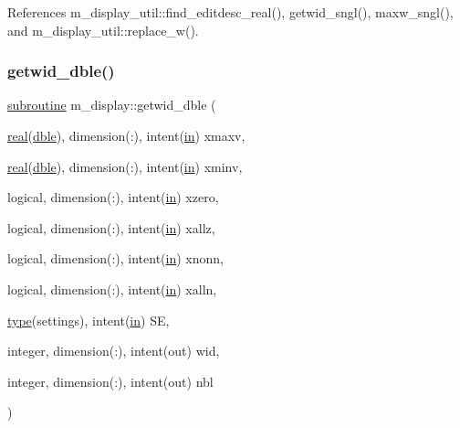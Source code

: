 References m\+\_\+display\+\_\+util\+::find\+\_\+editdesc\+\_\+real(), getwid\+\_\+sngl(), maxw\+\_\+sngl(), and m\+\_\+display\+\_\+util\+::replace\+\_\+w().

\mbox{\label{namespacem__display_abfcfe1ce55c2ec6aa7a261f6039a19d4}} 
\subsubsection{\texorpdfstring{getwid\+\_\+dble()}{getwid\_dble()}}
{\footnotesize\ttfamily \hyperlink{M__stopwatch_83_8txt_acfbcff50169d691ff02d4a123ed70482}{subroutine} m\+\_\+display\+::getwid\+\_\+dble (\begin{DoxyParamCaption}\item[{\hyperlink{read__watch_83_8txt_abdb62bde002f38ef75f810d3a905a823}{real}(\hyperlink{namespacem__display_a46d90b75b6ccef7ccade133e5847e815}{dble}), dimension(\+:), intent(\hyperlink{M__journal_83_8txt_afce72651d1eed785a2132bee863b2f38}{in})}]{xmaxv,  }\item[{\hyperlink{read__watch_83_8txt_abdb62bde002f38ef75f810d3a905a823}{real}(\hyperlink{namespacem__display_a46d90b75b6ccef7ccade133e5847e815}{dble}), dimension(\+:), intent(\hyperlink{M__journal_83_8txt_afce72651d1eed785a2132bee863b2f38}{in})}]{xminv,  }\item[{logical, dimension(\+:), intent(\hyperlink{M__journal_83_8txt_afce72651d1eed785a2132bee863b2f38}{in})}]{xzero,  }\item[{logical, dimension(\+:), intent(\hyperlink{M__journal_83_8txt_afce72651d1eed785a2132bee863b2f38}{in})}]{xallz,  }\item[{logical, dimension(\+:), intent(\hyperlink{M__journal_83_8txt_afce72651d1eed785a2132bee863b2f38}{in})}]{xnonn,  }\item[{logical, dimension(\+:), intent(\hyperlink{M__journal_83_8txt_afce72651d1eed785a2132bee863b2f38}{in})}]{xalln,  }\item[{\hyperlink{stop__watch_83_8txt_a70f0ead91c32e25323c03265aa302c1c}{type}(settings), intent(\hyperlink{M__journal_83_8txt_afce72651d1eed785a2132bee863b2f38}{in})}]{SE,  }\item[{integer, dimension(\+:), intent(out)}]{wid,  }\item[{integer, dimension(\+:), intent(out)}]{nbl }\end{DoxyParamCaption})\hspace{0.3cm}{\ttfamily [private]}}

